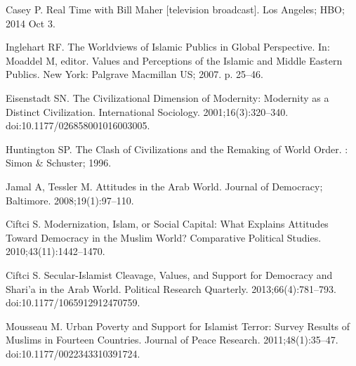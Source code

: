 \documentclass[10pt,letterpaper]{article}
\begin{document}
%
%
% 
\begin{thebibliography}{10}

Casey P. Real {{Time}} with {{Bill Maher}} [television broadcast]. Los Angeles; HBO; 2014 Oct 3.

Inglehart RF.
\newblock The {{Worldviews}} of {{Islamic Publics}} in {{Global Perspective}}.
\newblock In: Moaddel M, editor. Values and {{Perceptions}} of the {{Islamic}}
  and {{Middle Eastern Publics}}. {New York}: {Palgrave Macmillan US}; 2007. p.
  25--46.

Eisenstadt SN.
\newblock The {{Civilizational Dimension}} of {{Modernity}}: {{Modernity}} as a
  {{Distinct Civilization}}.
\newblock International Sociology. 2001;16(3):320--340.
\newblock doi:{10.1177/026858001016003005}.

Huntington SP.
\newblock The {{Clash}} of {{Civilizations}} and the {{Remaking}} of {{World
  Order}}.
: {Simon \& Schuster}; 1996.

Jamal A, Tessler M.
\newblock Attitudes in the {{Arab World}}.
\newblock Journal of Democracy; Baltimore. 2008;19(1):97--110.

Ciftci S.
\newblock Modernization, {{Islam}}, or {{Social Capital}}: {{What Explains
  Attitudes Toward Democracy}} in the {{Muslim World}}?
\newblock Comparative Political Studies. 2010;43(11):1442--1470.

Ciftci S.
\newblock Secular-{{Islamist Cleavage}}, {{Values}}, and {{Support}} for
  {{Democracy}} and {{Shari}}'a in the {{Arab World}}.
\newblock Political Research Quarterly. 2013;66(4):781--793.
\newblock doi:{10.1177/1065912912470759}.

Mousseau M.
\newblock Urban Poverty and Support for {{Islamist}} Terror: {{Survey}} Results
  of {{Muslims}} in Fourteen Countries.
\newblock Journal of Peace Research. 2011;48(1):35--47.
\newblock doi:{10.1177/0022343310391724}.


\end{thebibliography}
\end{document}
